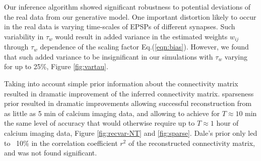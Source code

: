 Our inference algorithm showed significant robustness to potential deviations of the real data from our generative model.
One important distortion likely to occur in the real data is varying time-scales of EPSPs of different synapses.
Such variability in $\tau_w$ would result in added variance in the estimated weights $w_{ij}$ through $\tau_w$ dependence of the scaling factor Eq.(\ref{eqn:bias}).
However, we found that such added variance to be insignificant in our simulations with $\tau_w$ varying for up to 25\%, Figure \ref{fig:vartau}.

Taking into account simple prior information about the connectivity matrix resulted in dramatic improvement of the inferred connectivity matrix. sparseness prior resulted in dramatic improvements allowing successful reconstruction from as little as 5 min of calcium imaging data, and allowing to achieve for $T\approx 10$ min the same level of accuracy that would otherwise require up to $T\approx 1$ hour of calcium imaging data, Figure \ref{fig:recvar-NT} and \ref{fig:sparse}. Dale's prior only led to ~10\% in the correlation coefficient $r^2$ of the reconstructed connectivity matrix, and was not found significant.

